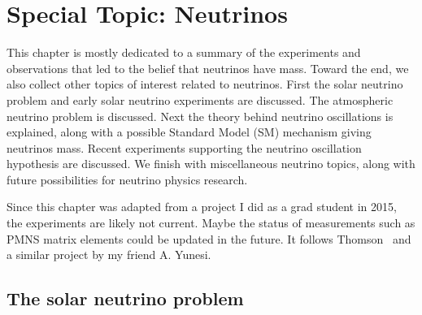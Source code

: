\chapter{Special Topic: Neutrinos}\label{ap:spec_neutrino}

This chapter is mostly dedicated to a summary of the experiments and 
observations that led to the belief
that neutrinos have mass. Toward the end, we also collect other topics of
interest related to neutrinos. First the solar neutrino problem and early solar
neutrino experiments are discussed. The atmospheric neutrino problem is
discussed. Next the theory behind neutrino oscillations is explained, along
with a possible Standard Model (SM) mechanism giving neutrinos mass. Recent
experiments supporting the neutrino oscillation hypothesis are discussed.
We finish with miscellaneous neutrino topics,
along with future possibilities for neutrino physics research.

Since this chapter was adapted from a project I did as a grad student in 2015,
the experiments are likely not current. Maybe the status of measurements
such as PMNS matrix elements could be updated in the future.
It follows Thomson~\cite{thomson_modern_2013} and a similar project by
my friend A. Yunesi.

\section{The solar neutrino problem}


